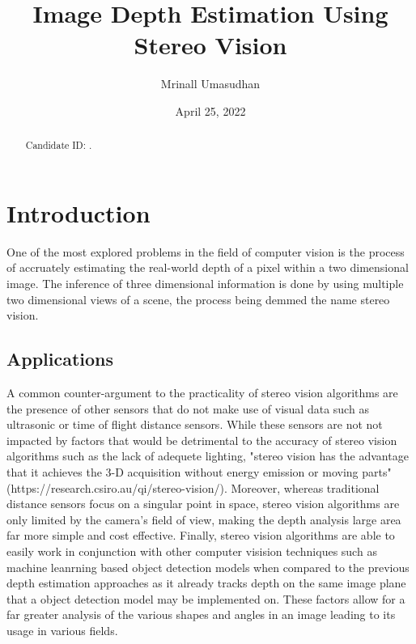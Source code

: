 \documentclass[11pt]{scrartcl}
\begin{document}
\title{Image Depth Estimation Using Stereo Vision}
\author{Mrinall Umasudhan}
\date{April 25, 2022}
\maketitle
{}

\begin{abstract}
	Candidate ID: .
\end{abstract}

\tableofcontents


\newpage
\section{Introduction}
One of the most explored problems in the field of computer vision is the process
of accruately estimating the real-world depth of a pixel within a two dimensional
image. The inference of three dimensional information is done by using multiple two
dimensional views of a scene, the process being demmed the name stereo vision. 

\subsection{Applications}
A common counter-argument to the practicality of stereo vision algorithms 
are the presence of other sensors that do not make use of visual data such 
as ultrasonic or time of flight distance sensors. While these sensors are not
not impacted by factors that would be detrimental to the accuracy of stereo 
vision algorithms such as the lack of adequete lighting,  
"stereo vision has the advantage that it achieves the 3-D acquisition without 
energy emission or moving parts" (https://research.csiro.au/qi/stereo-vision/). Moreover,
whereas traditional distance sensors focus on a singular point in space, stereo vision 
algorithms are only limited by the camera's field of view, making the depth analysis
large area far more simple and cost effective. Finally, stereo vision algorithms are able 
to easily work in conjunction with other 
computer visision techniques such as machine leanrning based object detection
models when compared to the previous depth estimation approaches as it already
tracks depth on the same image plane that a object detection model may be implemented on.
These factors allow for a far greater analysis of the 
various shapes and angles in an image leading to its usage in various fields. 
\\ 
\end{document}
